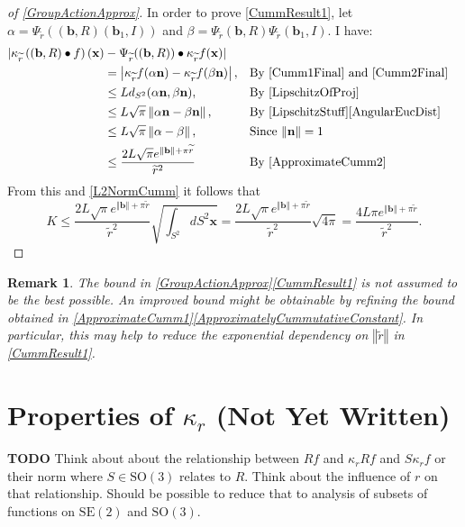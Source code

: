 \documentclass[a4paper,11pt]{scrartcl}
\newcounter{dummy}
\numberwithin{dummy}{section}
\theoremstyle{plain}
\theoremstyle{plain}
\newtheorem{remark}[dummy]{Remark}
\theoremstyle{plain}
\theoremstyle{plain}
\theoremstyle{nonumberplain}
\newtheorem{proof}{Proof}
\newcommand{\Ltwonorm}[1]{\left\Vert #1 \right\Vert} %
\newcommand{\SE}{\mathrm{SE}}
\newcommand{\SO}{\mathrm{SO}}
\begin{document}
\begin{proof}[of \cref{GroupActionApprox}]
		In order to prove \eqref{CummResult1}, let $ \alpha = \Psi_{\widetilde{r}} ((\mathbf{b}, R) (\mathbf{b}_{1}, I) ) $ and $ \beta = \Psi_{\widetilde{r}} (\mathbf{b}, R) \Psi_{\widetilde{r}} (\mathbf{b}_{1}, I) $. I have:
		\begin{align*}
		| \kappa_{\widetilde{r}} \left( (\mathbf{b}, R) \bullet f \right) (\mathbf{x}) &- \Psi_{\widetilde{r}} ((\mathbf{b}, R)) \bullet \kappa_{\widetilde{r}} f (\mathbf{x}) |\\
		&= \left| \kappa_{\widetilde{r}} f (\alpha \mathbf{n}) - \kappa_{\widetilde{r}} f (\beta \mathbf{n}) \right|, && \mbox{By \eqref{Cumm1Final} and \eqref{Cumm2Final}} \\
		&\le L d_{S^{2}} (\alpha \mathbf{n}, \beta \mathbf{n}), && \mbox{By \eqref{LipschitzOfProj}} \\
		&\le L \sqrt{\pi} \Ltwonorm{\alpha \mathbf{n} - \beta \mathbf{n}}, && \mbox{By \cref{LipschitzStuff}\ref{AngularEucDist}} \\
		&\le L \sqrt{\pi} \Ltwonorm{\alpha - \beta}, && \mbox{Since $ \Ltwonorm{\mathbf{n}} = 1 $} \\
		&\le \frac{2 L \sqrt{\pi} e^{\Ltwonorm{\mathbf{b}} + \pi \widetilde{r}}}{\widetilde{r}^{2}}  && \mbox{By \cref{ApproximateCumm2}}
		\end{align*}
		From this and \eqref{L2NormCumm} it follows that
		\begin{equation*}
		K
		\le \frac{2 L \sqrt{\pi} e^{\Ltwonorm{\mathbf{b}} + \pi \widetilde{r}}}{\widetilde{r}^{2}} \sqrt{\int_{S^{2}} dS^{2} \mathbf{x}}
		= \frac{2 L \sqrt{\pi} e^{\Ltwonorm{\mathbf{b}} + \pi \widetilde{r}}}{\widetilde{r}^{2}} \sqrt{4 \pi }
		= \frac{4 L \pi e^{\Ltwonorm{\mathbf{b}} + \pi \widetilde{r}}}{\widetilde{r}^{2}}.
		\end{equation*}
	\end{proof}
	
	\begin{remark}
		The bound in \cref{GroupActionApprox}\eqref{CummResult1} is not assumed to be the best possible. An improved bound might be obtainable by refining the bound obtained in \cref{ApproximateCumm1}\eqref{ApproximatelyCummutativeConstant}. In particular, this may help to reduce the exponential dependency on $ \Ltwonorm{\tilde{r}} $ in \eqref{CummResult1}.
	\end{remark}
	
	\section{Properties of $ \kappa_{r} $ (Not Yet Written)}
	\textbf{TODO} Think about about the relationship between $ R f $ and $ \kappa_{r} R f $ and $ S \kappa_{r} f $ or their norm  where $ S \in \SO(3) $ relates to $ R $. Think about the influence of $ r $ on that relationship. Should be possible to reduce that to analysis of subsets of functions on $ \SE(2) $ and $ \SO(3) $.
	
\end{document}

